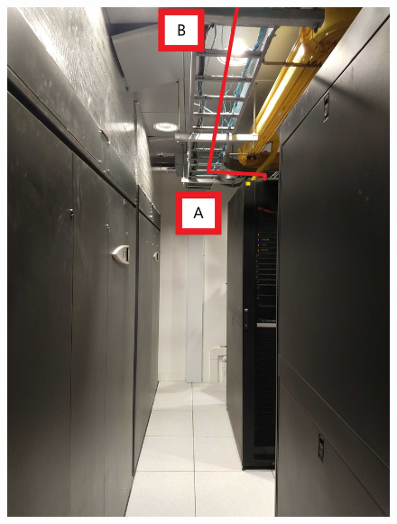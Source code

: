 \begin{figure}
  \includegraphics[width=\textwidth]{images/11.jpg}
  \label{fig:jlsimon}
\end{figure}

